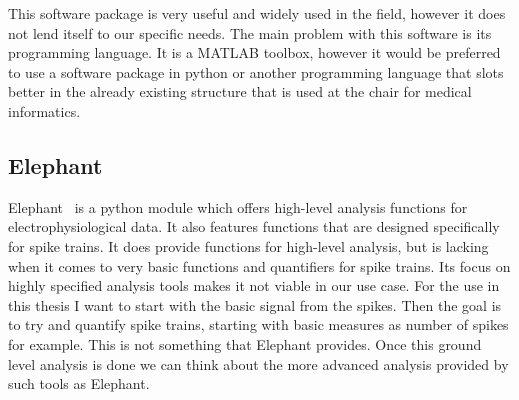 This software package is very useful and widely used in the field, however it does not lend itself to our specific needs.
The main problem with this software is its programming language. It is a MATLAB toolbox, however it would be preferred to use a software package in python or another programming language that slots better in the already existing structure that is used at the chair for medical informatics.  

\subsection{Elephant}
Elephant~\cite{elephant18} is a python module which offers high-level analysis functions for electrophysiological data.
It also features functions that are designed specifically for spike trains. It does provide functions for high-level analysis, but is lacking when it comes to very basic functions and quantifiers for spike trains. 
Its focus on highly specified analysis tools makes it not viable in our use case. For the use in this thesis I want to start with the basic signal from the spikes. Then the goal is to try and quantify spike trains, starting with basic measures as number of spikes for example. This is not something that Elephant provides. Once this ground level analysis is done we can think about the more advanced analysis provided by such tools as Elephant.

